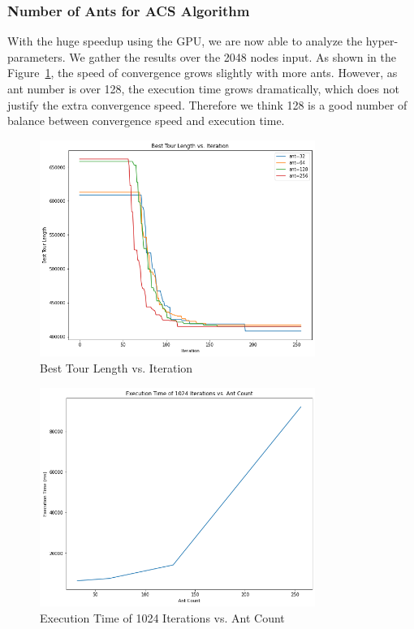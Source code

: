 \documentclass{article}
\begin{document}
\subsubsection{Number of Ants for ACS Algorithm}
With the huge speedup using the GPU, we are now able to analyze the hyper-parameters. We gather the results over the 2048 nodes input. As shown in the Figure~\ref{fig:ant_conv}, the speed of convergence grows slightly with more ants. However, as ant number is over 128, the execution time grows dramatically, which does not justify the extra convergence speed. Therefore we think 128 is a good number of balance between convergence speed and execution time. 
\begin{figure}
    \centering
    \includegraphics[width=0.8\textwidth]{ant_convergence.png}
    \caption{Best Tour Length vs. Iteration}
    \label{fig:ant_conv}
\end{figure}

\begin{figure}
    \centering
    \includegraphics[width=0.8\textwidth]{ant_time.png}
    \caption{Execution Time of 1024 Iterations vs. Ant Count}
    \label{fig:ant_time}
\end{figure}
\end{document}
